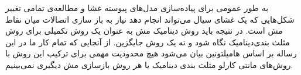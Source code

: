 به طور عمومی برای پیاده‌سازی مدل‌های پیوسته غشا و مطالعه‌ی تمامی تغییر شکل‌هایی که یک غشای سیال می‌تواند انجام دهد نیاز به باز سازی اتصالات میان نقاط مش است. در نتیجه باید روش دینامیک مش به عنوان یک روش تکمیلی برای روش مثلث بندی‌دینامیک نگاه شود و نه یک روش جایگزین. از آنجایی که تمام کار ما در این رساله بر اساس هامیلتونین بیان می‌شود هیچ محدودیت مهمی برای ترکیب این روش با روش‌های مانتی کارلو مثلث بندی دینامیک یا هر روش بازسازی مش دیگیری نمی‌بینیم.


%
%
%
% 
%
